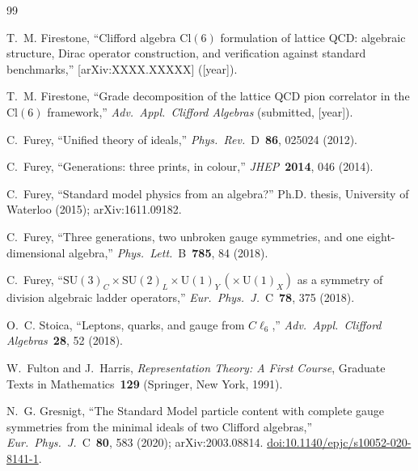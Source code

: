 \documentclass[12pt]{article}
\theoremstyle{remark}
\newcommand{\cl}{\mathrm{Cl}}
\newcommand{\su}{\mathrm{SU}}
\newcommand{\UU}{\mathrm{U}}
\begin{document}
\begin{thebibliography}{99}


	T.~M. Firestone,
	``Clifford algebra $\cl(6)$ formulation of lattice QCD: algebraic
	structure, Dirac operator construction, and verification against standard
	benchmarks,''
	[arXiv:XXXX.XXXXX] ([year]).

	T.~M. Firestone,
	``Grade decomposition of the lattice QCD pion correlator in the $\cl(6)$
	framework,''
	\textit{Adv.\ Appl.\ Clifford Algebras} (submitted, [year]).

	C.~Furey,
	``Unified theory of ideals,''
	\textit{Phys.\ Rev.}\ D~\textbf{86}, 025024 (2012).

	C.~Furey,
	``Generations: three prints, in colour,''
	\textit{JHEP}~\textbf{2014}, 046 (2014).

	C.~Furey,
	``Standard model physics from an algebra?''
	Ph.D. thesis, University of Waterloo (2015); arXiv:1611.09182.

	C.~Furey,
	``Three generations, two unbroken gauge symmetries, and one
	eight-dimensional algebra,''
	\textit{Phys.\ Lett.}\ B~\textbf{785}, 84 (2018).

	C.~Furey,
	``$\su(3)_C\times\su(2)_L\times\UU(1)_Y\,(\times\,\UU(1)_X)$ as a symmetry
	of division algebraic ladder operators,''
	\textit{Eur.\ Phys.\ J.}\ C~\textbf{78}, 375 (2018).

	O.~C. Stoica,
	``Leptons, quarks, and gauge from $C\ell_6$,''
	\textit{Adv.\ Appl.\ Clifford Algebras}~\textbf{28}, 52 (2018).

	W.~Fulton and J.~Harris,
	\textit{Representation Theory: A First Course},
	Graduate Texts in Mathematics~\textbf{129} (Springer, New York, 1991).

	N.~G. Gresnigt,
	``The Standard Model particle content with complete gauge symmetries from
	the minimal ideals of two Clifford algebras,''
	\textit{Eur.\ Phys.\ J.}\ C~\textbf{80}, 583 (2020);
	arXiv:2003.08814.
	\href{https://doi.org/10.1140/epjc/s10052-020-8141-1}{doi:10.1140/epjc/s10052-020-8141-1}.


\end{thebibliography}
\end{document}
